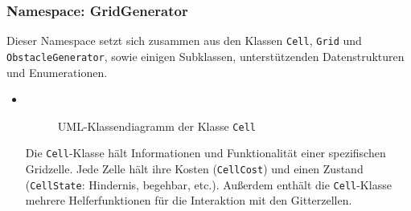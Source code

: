\subsubsection{Namespace: GridGenerator}
\label{subsubsec:aufbau_backend_ueberblick_gridgen}
Dieser Namespace setzt sich zusammen aus den Klassen \texttt{Cell}, \texttt{Grid} und \texttt{Obstacle\-Generator}, sowie einigen Subklassen, unterstützenden Datenstrukturen und Enumerationen.
\begin{itemize}
    \item {} \\
    \begin{figure}[H]
        \vspace{-0.5cm}
        \centering
        
        \caption{UML-Klassendiagramm der Klasse \texttt{Cell}}
        \label{fig:uml_cell}
    \end{figure}
    Die \texttt{Cell}-Klasse hält Informationen und Funktionalität einer spezifischen Gridzelle.
    Jede Zelle hält ihre Kosten (\texttt{CellCost}) und einen Zustand (\texttt{Cell\-State}: Hindernis, begehbar, etc.).
    Außerdem enthält die \texttt{Cell}-Klasse mehrere Helferfunktionen für die Interaktion mit den Gitterzellen.


\end{itemize}
